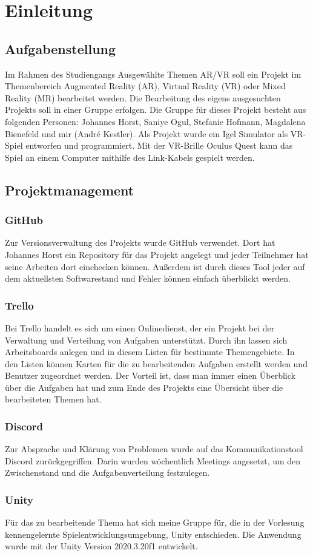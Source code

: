\chapter{Einleitung}

\section{Aufgabenstellung}
Im Rahmen des Studiengangs Ausgewählte Themen AR/VR soll ein Projekt im Themenbereich Augmented Reality (AR), Virtual Reality (VR) oder Mixed Reality (MR) bearbeitet werden. Die Bearbeitung des eigens ausgesuchten Projekts soll in einer Gruppe erfolgen. Die Gruppe für dieses Projekt besteht aus folgenden Personen: Johannes Horst, Saniye Ogul, Stefanie Hofmann, Magdalena Bienefeld und mir (André Kestler). Als Projekt wurde ein Igel Simulator als VR-Spiel entworfen und programmiert. Mit der VR-Brille Oculus Quest kann das Spiel an einem Computer mithilfe des Link-Kabels gespielt werden. 


\section{Projektmanagement}
\subsection{GitHub}
Zur Versionsverwaltung des Projekts wurde GitHub verwendet. Dort hat Johannes Horst ein Repository für das Projekt angelegt und jeder Teilnehmer hat seine Arbeiten dort einchecken können. Außerdem ist durch dieses Tool jeder auf dem aktuellsten Softwarestand und Fehler können einfach überblickt werden. \cite{GitHub}


\subsection{Trello}
Bei Trello handelt es sich um einen Onlinedienst, der ein Projekt bei der Verwaltung und Verteilung von Aufgaben unterstützt. Durch ihn lassen sich Arbeitsboards anlegen und in diesem Listen für bestimmte Themengebiete. In den Listen können Karten für die zu bearbeitenden Aufgaben erstellt werden und Benutzer zugeordnet werden. Der Vorteil ist, dass man immer einen Überblick über die Aufgaben hat und zum Ende des Projekts eine Übersicht über die bearbeiteten Themen hat. \cite{Trello}

\subsection{Discord}
Zur Absprache und Klärung von Problemen wurde auf das Kommunikationstool Discord zurückgegriffen. Darin wurden wöchentlich Meetings angesetzt, um den Zwischenstand und die Aufgabenverteilung festzulegen.

\subsection{Unity}
Für das zu bearbeitende Thema hat sich meine Gruppe für, die in der Vorlesung kennengelernte Spielentwicklungsumgebung, Unity entschieden. Die Anwendung wurde mit der Unity Version 2020.3.20f1 entwickelt.  \cite{Unity}

